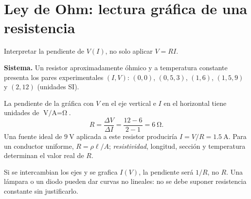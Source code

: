 \documentclass[11pt,a4paper]{article}
\newcommand{\ej}[2]{\clearpage\section{#2}}
\begin{document}
\ej{7}{Ley de Ohm: lectura gráfica de una resistencia}
\begin{objetivo}Interpretar la pendiente de $V(I)$, no solo aplicar $V=RI$.\end{objetivo}
\textbf{Sistema.} Un resistor aproximadamente óhmico y a temperatura constante presenta los pares experimentales $(I,V)$: $(0,0)$, $(0{,}5,3)$, $(1,6)$, $(1{,}5,9)$ y $(2,12)$ (unidades SI).
\begin{center}\end{center}
\begin{metodo}
La pendiente de la gráfica con $V$ en el eje vertical e $I$ en el horizontal tiene unidades de $\si{\volt\per\ampere}=\si{\ohm}$.
\[R=\frac{\Delta V}{\Delta I}=\frac{12-6}{2-1}=\boxed{\SI{6}{\ohm}}.\]
Una fuente ideal de $\SI{9}{\volt}$ aplicada a este resistor produciría $I=V/R=\SI{1.5}{\ampere}$. Para un conductor uniforme, $R=\rho\ell/A$; \emph{resistividad}, longitud, sección y temperatura determinan el valor real de $R$.
\end{metodo}
\begin{alerta}Si se intercambian los ejes y se grafica $I(V)$, la pendiente será $1/R$, no $R$. Una lámpara o un diodo pueden dar curvas no lineales: no se debe suponer resistencia constante sin justificarlo.\end{alerta}
\end{document}
